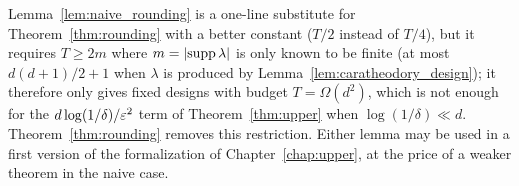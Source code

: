 \begin{remark}
Lemma~\ref{lem:naive_rounding} is a one-line substitute for Theorem~\ref{thm:rounding} with a
better constant ($T/2$ instead of $T/4$), but it requires $T \ge 2m$ where $m = \lvert \operatorname{supp}\lambda \rvert$
is only known to be finite (at most $d(d+1)/2+1$ when $\lambda$ is produced by
Lemma~\ref{lem:caratheodory_design}); it therefore only gives
fixed designs with budget $T = \Omega(d^2)$, which is not enough for the $d\log(1/\delta)/\varepsilon^2$
term of Theorem~\ref{thm:upper} when $\log(1/\delta) \ll d$. Theorem~\ref{thm:rounding} removes
this restriction. Either lemma may be used in a first version of the formalization of
Chapter~\ref{chap:upper}, at the price of a weaker theorem in the naive case.
\end{remark}
